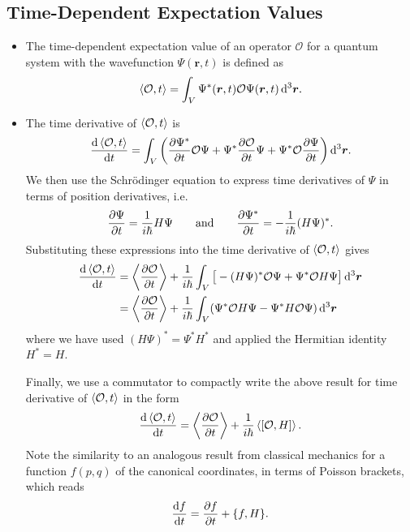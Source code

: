 \documentclass[11pt, a4paper]{article}
\newcommand{\diff}{\mathop{}\!\mathrm{d}} %
\newcommand{\dr}{\diff^{3} \r}  %
\newcommand{\eqtext}[1]{\qquad \text{#1} \qquad}
\newcommand{\Schro}{Schr\"{o}dinger\xspace}
\renewcommand{\vec}[1]{\bm{#1}}  %
\renewcommand{\r}{\vec{r}}  %
\renewcommand{\O}{\mathcal{O}}  %
\renewcommand{\P}{\Psi}  %
\begin{document}
\subsection{Time-Dependent Expectation Values}
\begin{itemize}
	\item The time-dependent expectation value of an operator $ \O $ for a quantum system with the wavefunction $ \P(\r, t) $ is defined as
	\begin{equation*}
		\ev{\O, t} = \int_{V} \P^{*}(\r, t) \O \P(\r, t) \dr.
	\end{equation*}
	
	\item The time derivative of $ \ev{\O, t} $ is
	\begin{equation*}
		\dv{\ev{\O, t}}{t} = \int_{V} \left(\pdv{\P^{*}}{t} \O \P + \P^{*}\pdv{\O}{t}\P + \P^{*}\O \pdv{\P}{t}\right) \dr.
	\end{equation*}
	We then use the \Schro equation to express time derivatives of $ \P $ in terms of position derivatives, i.e.
	\begin{equation*}
		\pdv{\P}{t} = \frac{1}{i\hbar}H \P \eqtext{and} \pdv{\P^{*}}{t} = -\frac{1}{i\hbar}(H \P)^{*}.
	\end{equation*}
	Substituting these expressions into the time derivative of $ \ev{\O, t} $ gives
	\begin{align*}
		\dv{\ev{\O, t}}{t} &= \ev{\pdv{\O}{t}} + \frac{1}{i \hbar} \int_{V} \big[- (H\P)^{*}\O \P + \P^{*}\O H \P \big] \dr\\
		& = \ev{\pdv{\O}{t}} + \frac{1}{i \hbar} \int_{V} (\P^{*}\O H \P - \P^{*}H \O \P) \dr
	\end{align*}
	where we have used $ (H \P)^{*} = \P^{*}H^{*} $ and applied the Hermitian identity $ H^{*} = H $. 
	
	Finally, we use a commutator to compactly write the above result for time derivative of $ \ev{\O, t} $ in the form
	\begin{equation*}
		\dv{\ev{\O, t}}{t} =  \ev{\pdv{\O}{t}} + \frac{1}{i\hbar}\ev{[\O, H]}.
	\end{equation*}
	Note the similarity to an analogous result from classical mechanics for a function $ f(p, q) $ of the canonical coordinates, in terms of Poisson brackets, which reads 
	\begin{equation*}
		\dv{f}{t} = \pdv{f}{t} + \{f, H\}.
	\end{equation*}
\end{itemize}
\end{document}
